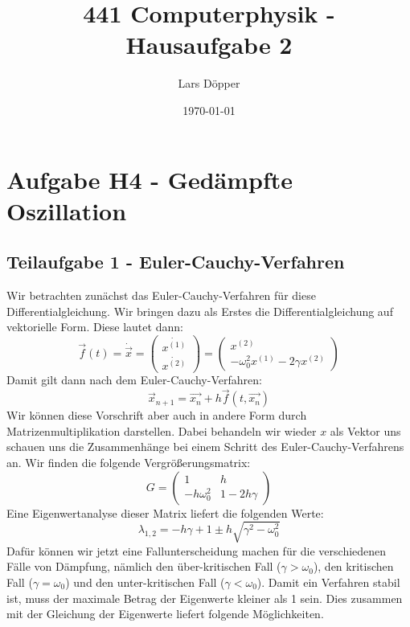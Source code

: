 \documentclass[12pt,a4paper]{article}
\author{Lars Döpper}
\date{\today}
\title{441 Computerphysik - Hausaufgabe 2}
\begin{document}
	\maketitle
\section{Aufgabe H4 - Gedämpfte Oszillation}
\subsection{Teilaufgabe 1 - Euler-Cauchy-Verfahren}
Wir betrachten zunächst das Euler-Cauchy-Verfahren für diese Differentialgleichung. Wir bringen dazu als Erstes die Differentialgleichung auf vektorielle Form. Diese lautet dann:
\begin{equation}
	\vec{f}(t) = \dot{\vec{x}} = \begin{pmatrix} \dot{x^{(1)}} \\ \dot{x^{(2)}}	\end{pmatrix} = 
	\begin{pmatrix}	x^{(2)} \\ -\omega_0^2x^{(1)} - 2\gamma x^{(2)}	\end{pmatrix}
\end{equation}
Damit gilt dann nach dem Euler-Cauchy-Verfahren:
\begin{equation}
	\vec{x}_{n+1} = \vec{x_n} + h\vec{f}(t,\vec{x_n})
\end{equation}
Wir können diese Vorschrift aber auch in andere Form durch Matrizenmultiplikation darstellen. Dabei behandeln wir wieder $x$ als Vektor uns schauen uns die Zusammenhänge bei einem Schritt des Euler-Cauchy-Verfahrens an. Wir finden die folgende Vergrößerungsmatrix:
\begin{equation}
	G = \begin{pmatrix}	1 & h \\ -h\omega_0^2 & 1-2h\gamma \end{pmatrix}
\end{equation}
Eine Eigenwertanalyse dieser Matrix liefert die folgenden Werte:
\begin{equation}
	\lambda_{1,2} = -h\gamma + 1 \pm h\sqrt{\gamma^2 - \omega_0^2}
\end{equation}
Dafür können wir jetzt eine Fallunterscheidung machen für die verschiedenen Fälle von Dämpfung, nämlich den über-kritischen Fall ($\gamma > \omega_0$), den kritischen Fall ($\gamma = \omega_0$) und den unter-kritischen Fall ($\gamma <\omega_0$). Damit ein Verfahren stabil ist, muss der maximale Betrag der Eigenwerte kleiner als 1 sein. Dies zusammen mit der Gleichung der Eigenwerte liefert folgende Möglichkeiten.
\end{document}
